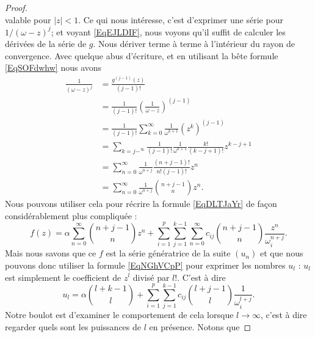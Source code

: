 \begin{proof}
\begin{equation}
    \end{equation}
    valable pour \( | z |<1\). Ce qui nous intéresse, c'est d'exprimer une série pour \( 1/(\omega-z)^j\); et voyant \eqref{EqEJLDIF}, nous voyons qu'il suffit de calculer les dérivées de la série de \( g\). Nous dériver terme à terme à l'intérieur du rayon de convergence. Avec quelque abus d'écriture, et en utilisant la bête formule \eqref{EqSOFdwhw} nous avons
    \begin{subequations}
        \begin{align}
            \frac{1}{ (\omega-z)^j }&=\frac{ g^{(j-1)}(z) }{ (j-1)! }\\
            &=\frac{1}{ (j-1)! }\left( \frac{1}{ \omega-z } \right)^{(j-1)}\\
            &=\frac{1}{ (j-1)! }\sum_{k=0}^{\infty}\frac{1}{ \omega^{k+1} }(z^k)^{(j-1)}\\
            &=\sum_{k=j-^{\infty}}\frac{1}{ (j-1)! }\frac{1}{ \omega^{k+1} }\frac{ k! }{ (k-j+1)! }z^{k-j+1}\\
            &=\sum_{n=0}^{\infty}\frac{1}{ \omega^{n+j} }\frac{ (n+j-1)! }{ n!(j-1)! }z^n\\
            &=\sum_{n=0}^{\infty}\frac{1}{ \omega^{n+j} }{n+j-1\choose n}z^n.
        \end{align}
    \end{subequations}
    Nous pouvons utiliser cela pour récrire la formule \eqref{EqDLTJaYr} de façon considérablement plus compliquée :
    \begin{equation}
            f(z)=\alpha\sum_{n=0}^{\infty}{n+j-1\choose n}z^n
            +\sum_{i=1}^p\sum_{j=1}^{k-1}\sum_{n=0}^{\infty}c_{ij}{n+j-1\choose n}\frac{ z^n }{ \omega_i^{n+j} }.
    \end{equation}
    Mais nous savons que ce \( f\) est la série génératrice de la suite \( (u_n)\) et que nous pouvons donc utiliser la formule \eqref{EqNGhVCpP} pour exprimer les nombres \( u_l\) : \( u_l\) est simplement le coefficient de \( z^l\) divisé par \( l!\). C'est à dire
    \begin{equation}
        u_l=\alpha{l+k-1\choose l}+\sum_{i=1}^p\sum_{j=1}^{k-1}c_{ij}{l+j-1\choose l}\frac{1}{ \omega_i^{l+j} }.
    \end{equation}
    Notre boulot est d'examiner le comportement de cela lorsque \( l\to\infty\), c'est à dire regarder quels sont les puissances de \( l\) en présence. Notons que 


\end{proof}
